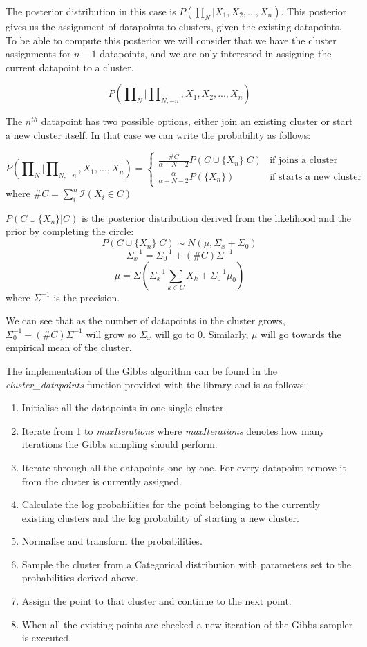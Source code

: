 \documentclass[12pt,a4paper]{article}
\begin{document}
The posterior distribution in this case is $P(\prod\nolimits_{N}|X_{1}, X_{2}, ..., X_{n})$. This posterior gives us the assignment of datapoints to clusters, given the existing datapoints. To be able to compute this posterior we will consider that we have the cluster assignments for $n-1$ datapoints, and we are only interested in assigning the current datapoint to a cluster. 

$$P(\prod\nolimits_{N}|\prod\nolimits_{N, -n}, X_{1}, X_{2}, ..., X_{n})$$

The $n^{th}$ datapoint has two possible options, either join an existing cluster or start a new cluster itself. In that case we can write the probability as follows: 

$$P(\prod\nolimits_{N}|\prod\nolimits_{N, -n}, X_{1}, ..., X_{n}) = \left \{
    \begin{array}{ll}
		\frac{\#C}{\alpha+ N - 2}P(C \cup \{X_{n}\}|C) & \mbox{if joins a cluster} \\
		\frac{\alpha}{\alpha+N-2}P(\{X_{n}\}) & \mbox{if starts a new cluster} 
	\end{array}
\right.$$
where $\#C = \sum_{i}^{n}\mathcal{I}(X_{i} \in C)$

$P(C \cup \{X_{n}\}|C)$ is the posterior distribution derived from the likelihood and the prior by completing the circle:
$$P(C \cup \{X_{n}\}|C) \sim N(\mu, \Sigma_{x} + \Sigma_{0})$$
$$\Sigma_{x}^{-1} = \Sigma_{0}^{-1} + (\#C)\Sigma^{-1}$$
$$\mu = \Sigma(\Sigma_{x}^{-1}\sum_{k \in C}X_{k} + \Sigma_{0}^{-1}\mu_{0})$$
where $\Sigma^{-1}$ is the precision.

We can see that as the number of datapoints in the cluster grows, $\Sigma_{0}^{-1} + (\#C)\Sigma^{-1}$ will grow so $\Sigma_{x}$ will go to 0. Similarly, $\mu$ will go towards the empirical mean of the cluster.

The implementation of the Gibbs algorithm can be found in the \textit{cluster\_datapoints} function provided with the library and is as follows:

\begin{enumerate}
    \item Initialise all the datapoints in one single cluster.
    \item Iterate from 1 to \textit{maxIterations} where \textit{maxIterations} denotes how many iterations the Gibbs sampling should perform. 
    \item Iterate through all the datapoints one by one. For every datapoint remove it from the cluster is currently assigned.
    \item Calculate the log probabilities for the point belonging to the currently existing clusters and the log probability of starting a new cluster.
    \item Normalise and transform the probabilities.
    \item Sample the cluster from a Categorical distribution with parameters set to the probabilities derived above.
    \item Assign the point to that cluster and continue to the next point.
    \item When all the existing points are checked a new iteration of the Gibbs sampler is executed. 
\end{enumerate}
\end{document}
